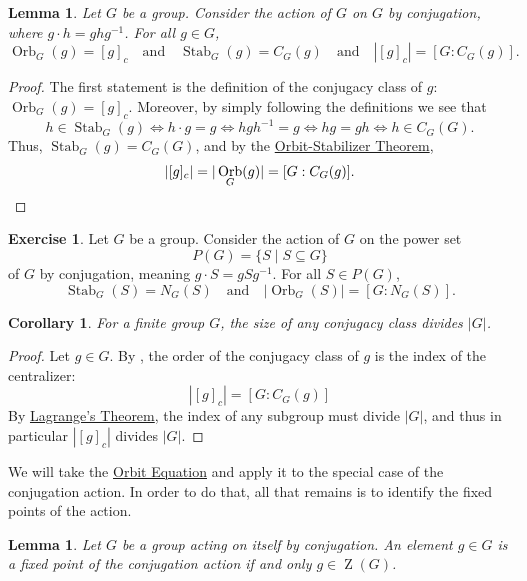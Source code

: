 \documentclass[12pt]{report}
\newtheorem{lemma}[theorem]{Lemma}
\newtheorem{corollary}[theorem]{Corollary}
\numberwithin{equation}{section}
\numberwithin{theorem}{chapter}
\theoremstyle{definition}
\newtheorem{exercise}{Exercise}
\newtheorem*{basic properties}{Basic Properties}
\newtheorem*{Important Remark}{Important Remark}
\DeclareMathOperator{\Orb}{Orb}
\DeclareMathOperator{\Zc}{Z}
\DeclareMathOperator{\Stab}{Stab}
\begin{document}
\begin{lemma}\label{conjugacy class}
	Let $G$ be a group. Consider the action of $G$ on $G$ by conjugation, where $g \cdot h = ghg^{-1}$. For all $g \in G$, 
$$\Orb_G(g) = [g]_c \quad \textrm{and} \quad \Stab_G(g)=C_G(g) \quad \textrm{and} \quad |[g]_c| = [G : C_G(g)].$$
\end{lemma}


\begin{proof}
	The first statement is the definition of the conjugacy class of $g$: $\Orb_G(g) = [g]_c$. 	
	Moreover, by simply following the definitions we see that
	$$h \in \Stab_G(g) \iff h \cdot g = g \iff hgh^{-1} = g \iff hg = gh \iff h \in C_G(G).$$
	Thus, $\Stab_G(g)=C_G(G)$, and by the \hyperref[Orbit-Stabilizer Theorem]{Orbit-Stabilizer Theorem},
	$$|[g]_c| = |\Orb_G(g)| = [G : C_G(g)].\qedhere$$
\end{proof}


\begin{exercise}\label{conjugacy class exercise}
Let $G$ be a group. Consider the action of $G$ on the power set 
$$P(G)=\{S\mid S\subseteq G\}$$ 
of $G$ by conjugation, meaning $g \cdot S = gSg^{-1}$. For all $S \in P(G)$, 
$$\Stab_G(S)=N_G(S) \quad \textrm{and} \quad |\Orb_G(S)| = [G : N_G(S)].$$
\end{exercise}


\begin{corollary}
For a finite group $G$, the size of any conjugacy class divides $|G|$.	
\end{corollary}

\begin{proof}
Let $g \in G$. By , the order of the conjugacy class of $g$ is the index of the centralizer: 
$$|[g]_c| = [G : C_G(g)]$$ 
By \hyperref[Lagrange]{Lagrange's Theorem}, the index of any subgroup must divide $|G|$, and thus in particular $|[g]_c|$ divides $|G|$.
\end{proof}


We will take the \hyperref[Orbit Equation]{Orbit Equation} and apply it to the special case of the conjugation action. In order to do that, all that remains is to identify the fixed points of the action.


\begin{lemma}\label{fixed points conjugation are central}
	Let $G$ be a group acting on itself by conjugation. An element $g \in G$ is a fixed point of the conjugation action if and only $g \in \Zc(G)$.
\end{lemma}
\end{document}
